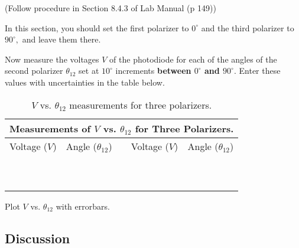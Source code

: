(Follow procedure in Section 8.4.3 of Lab Manual (p 149))
\vspace*{.5cm}

\noindent
In this section, you should set the first polarizer to $0^{\circ}$ and the third
polarizer to $90^{\circ},$ and leave them there.
\vspace*{.5cm}

\noindent 
Now measure the voltages $V$ of the photodiode for each of the angles of the second 
polarizer $\theta _{12}$ set at $10^{\circ}$ increments 
{\bf between $0^{\circ}$ and $90^{\circ}.$} Enter these values with uncertainties in
the table below.
 
\begin{table}[htb]
\begin{center}
\begin{tabular}{|c|c|c|c|c|}
\hline
\multicolumn{5}{|c|}{Measurements of $V$ vs. $\theta _{12}$ for
 Three Polarizers.} \\
\hline
Voltage ($V$) & Angle ($\theta _{12}$) & & Voltage ($V$) & Angle ($\theta _{12}$) \\
\hline
\hspace*{3cm} & \hspace*{3cm} & \hspace*{.3cm} & \hspace*{3cm} & \hspace*{3cm} \\
& & & & \\
\hline
& & & & \\
& & & & \\
\hline
& & & & \\
& & & & \\
\hline
& & & & \\
& & & & \\
\hline
& & & & \\
& & & & \\
\hline
\end{tabular}
\end{center}
\caption{$V$ vs. $\theta _{12}$ measurements for three polarizers.}
\label {tab:PO:3lens}
\end{table}

Plot $V$ vs. $\theta _{12}$ with errorbars.

\newpage

\subsection{Discussion}

